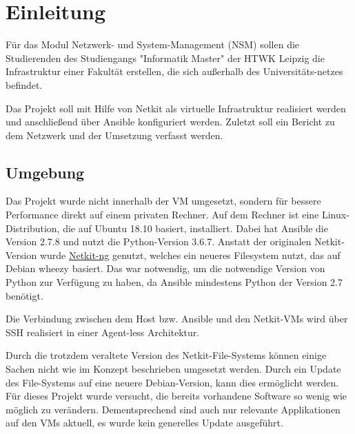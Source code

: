 \chapter{Einleitung}

Für das Modul Netzwerk- und System-Management (NSM) sollen die Studierenden des Studiengangs "Informatik Master" der HTWK Leipzig die Infrastruktur einer Fakultät erstellen, die sich außerhalb des Universitäts-netzes befindet.

Das Projekt soll mit Hilfe von Netkit als virtuelle Infrastruktur realisiert werden und anschließend über Ansible konfiguriert werden. Zuletzt soll ein Bericht zu dem Netzwerk und der Umsetzung verfasst werden.

\section{Umgebung}

Das Projekt wurde nicht innerhalb der VM umgesetzt, sondern für bessere Performance direkt auf einem privaten Rechner. Auf dem Rechner ist eine Linux-Distribution, die auf Ubuntu 18.10 basiert, installiert. Dabei hat Ansible die Version 2.7.8 und nutzt die Python-Version 3.6.7. Anstatt der originalen Netkit-Version wurde \href{https://netkit-ng.github.io/}{Netkit-ng} genutzt, welches ein neueres Filesystem nutzt, das auf Debian wheezy basiert. Das war notwendig, um die notwendige Version von Python zur Verfügung zu haben, da Ansible mindestens Python der Version 2.7 benötigt.

Die Verbindung zwischen dem Host bzw. Ansible und den Netkit-VMs wird über SSH realisiert in einer Agent-less Architektur.

Durch die trotzdem veraltete Version des Netkit-File-Systems können einige Sachen nicht wie im Konzept beschrieben umgesetzt werden. Durch ein Update des File-Systems auf eine neuere Debian-Version, kann dies ermöglicht werden. Für dieses Projekt wurde versucht, die bereits vorhandene Software so wenig wie möglich zu verändern. Dementsprechend sind auch nur relevante Applikationen auf den VMs aktuell, es wurde kein generelles Update ausgeführt.
